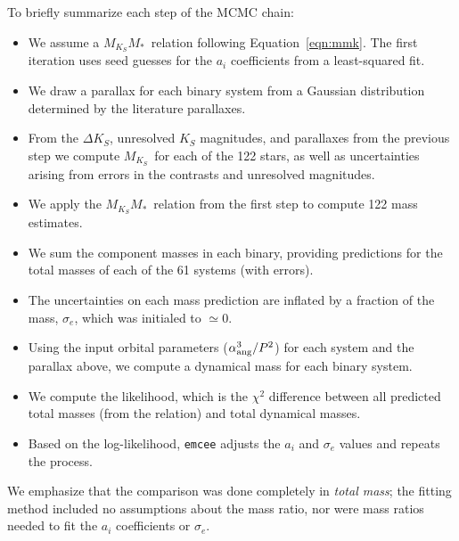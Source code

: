 \documentclass[twocolumn]{aastex62}
\newcommand{\mks}{$M_{K_S}$}
\newcommand{\mmk}{$M_{K_S}$\textendash$M_*$}
\begin{document}
To briefly summarize each step of the MCMC chain:
\begin{itemize}
\item We assume a \mmk\ relation following Equation~\ref{eqn:mmk}. The first iteration uses seed guesses for the $a_i$ coefficients from a least-squared fit. 
\item We draw a parallax for each binary system from a Gaussian distribution determined by the literature parallaxes.
\item From the $\Delta K_S$, unresolved $K_S$ magnitudes, and parallaxes from the previous step we compute \mks\ for each of the 122 stars, as well as uncertainties arising from errors in the contrasts and unresolved magnitudes.
\item We apply the \mmk\ relation from the first step to compute 122 mass estimates.
\item We sum the component masses in each binary, providing predictions for the total masses of each of the 61 systems (with errors).
\item The uncertainties on each mass prediction are inflated by a fraction of the mass, $\sigma_e$, which was initialed to $\simeq$0. 
\item Using the input orbital parameters ($\alpha_{\rm{ang}}^3/P^2$) for each system and the parallax above, we compute a dynamical mass for each binary system. 
\item We compute the likelihood, which is the $\chi^2$ difference between all predicted total masses (from the relation) and total dynamical masses.
\item Based on the log-likelihood, {\tt emcee} adjusts the $a_i$ and $\sigma_e$ values and repeats the process.
\end{itemize}
We emphasize that the comparison was done completely in {\it total mass}; the fitting method included no assumptions about the mass ratio, nor were mass ratios needed to fit the $a_i$ coefficients or $\sigma_e$. 
\end{document}
